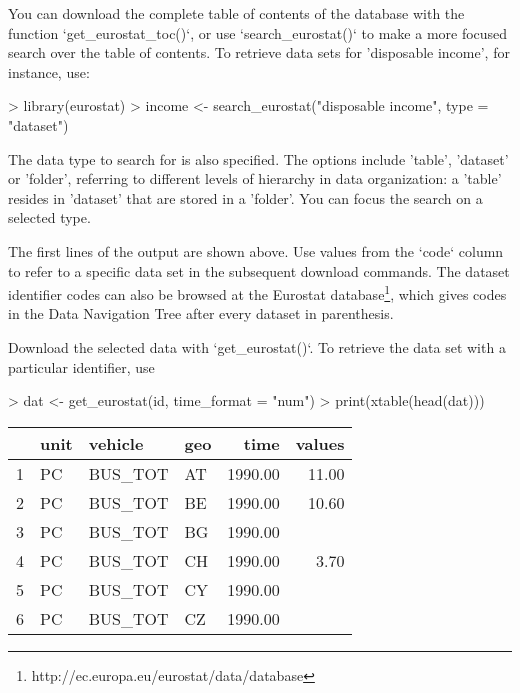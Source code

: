 You can download the complete table of contents of the database with the function `get\_eurostat\_toc()`, or use `search\_eurostat()` to make a more focused search over the table of contents. To retrieve data sets for 'disposable income', for instance, use:

\begin{Schunk}
\begin{Sinput}
> library(eurostat)
> income <- search_eurostat("disposable income", type = "dataset")
\end{Sinput}
\end{Schunk}

The data type to search for is also specified. The options include 'table', 'dataset' or 'folder', referring to different levels of hierarchy in data organization: a 'table' resides in 'dataset' that are stored in a 'folder'. You can focus the search on a selected type.

The first lines of the output are shown above. Use values from the `code` column to refer to a specific data set in the subsequent download commands. The dataset identifier codes can also be browsed at the Eurostat
database\footnote{http://ec.europa.eu/eurostat/data/database}, which gives
codes in the Data Navigation Tree after every dataset in parenthesis.

Download the selected data with `get\_eurostat()`. To retrieve the data set with a particular identifier, use 

\begin{Schunk}
\begin{Sinput}
> dat <- get_eurostat(id, time_format = "num")
> print(xtable(head(dat)))
\end{Sinput}
% latex table generated in R 3.2.2 by xtable 1.8-0 package
% Mon Nov 23 13:41:40 2015
\begin{table}[ht]
\centering
\begin{tabular}{rlllrr}
  \hline
 & unit & vehicle & geo & time & values \\ 
  \hline
1 & PC & BUS\_TOT & AT & 1990.00 & 11.00 \\ 
  2 & PC & BUS\_TOT & BE & 1990.00 & 10.60 \\ 
  3 & PC & BUS\_TOT & BG & 1990.00 &  \\ 
  4 & PC & BUS\_TOT & CH & 1990.00 & 3.70 \\ 
  5 & PC & BUS\_TOT & CY & 1990.00 &  \\ 
  6 & PC & BUS\_TOT & CZ & 1990.00 &  \\ 
   \hline
\end{tabular}
\end{table}\end{Schunk}

